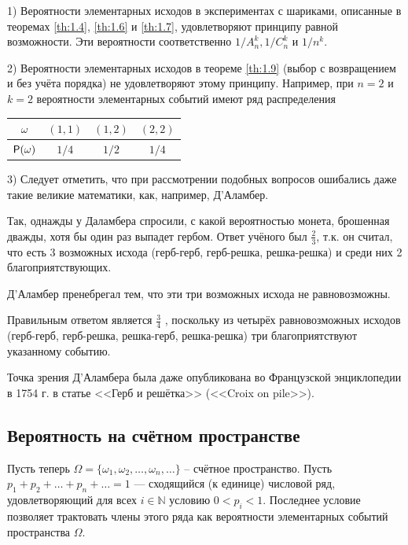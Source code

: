 \begin{zam}
	\label{zam:4.11}
1) Вероятности элементарных исходов в экспериментах с шариками, описанные в теоремах \ref{th:1.4}, \ref{th:1.6} и \ref{th:1.7}, удовлетворяют принципу равной возможности. Эти вероятности соответственно $1/A_n^k , 1/C_n^k$ и $1/n^k$.

2) Вероятности элементарных исходов в теореме \ref{th:1.9} (выбор с возвращением и без учёта порядка) не удовлетворяют этому принципу. Например, при $n = 2$
и $k = 2$ вероятности элементарных событий имеют ряд распределения

\begin{center}
	\begin{tabular}{|c|c|c|c|}
		\hline
		$\omega$ & $(1,1)$ & $(1,2)$ & $(2,2)$ \\ \hline
		$\P(\omega)$  & $1/4$ & $1/2$  & $1/4$ \\ \hline
	\end{tabular}
\end{center}

3) Следует отметить, что при рассмотрении подобных вопросов ошибались даже такие великие математики, как, например, Д'Аламбер. 

Так, однажды у Даламбера спросили, с какой вероятностью монета, брошенная дважды, хотя бы один раз выпадет гербом. Ответ учёного был $\frac{2}{3}$, т.к. он считал, что есть 3 возможных исхода (герб-герб, герб-решка, решка-решка) и среди них 2 благоприятствующих. 

Д'Аламбер пренебрегал тем, что эти три возможных исхода не равновозможны. 

Правильным ответом является $\frac{3}{4}$ , поскольку из четырёх равновозможных исходов (герб-герб, герб-решка, решка-герб, решка-решка) три благоприятствуют указанному событию. 

Точка зрения Д'Аламбера была даже опубликована во Французской энциклопедии в 1754 г. в статье <<Герб и решётка>> (<<Croix on pile>>).
\end{zam}
 

\subsection{Вероятность на счётном пространстве}
Пусть теперь $\Omega = \{\omega_1 , \omega_2 , \ldots , \omega_n , \ldots \}$ – счётное пространство. Пусть $p_1 + p_2 + \ldots + p_n + \ldots = 1$ — сходящийся (к единице) числовой ряд, удовлетворяющий
для всех $i \in \mathbb{N}$ условию $0 < p_i < 1$. Последнее условие позволяет трактовать члены этого ряда как вероятности элементарных событий пространства $\Omega$.

